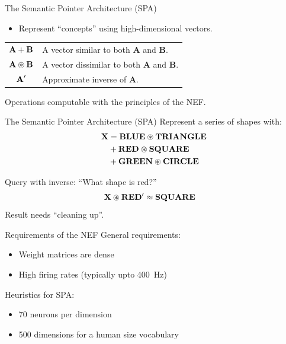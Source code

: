 \documentclass[handout,t]{beamer}
\newcommand{\semanticpointer}{\textbf}
\newcommand{\msemanticpointer}[1]{\mbox{\semanticpointer{#1}}}
\begin{document}
  \begin{frame}{The Semantic Pointer Architecture (SPA)}
    \begin{itemize}
      \item Represent ``concepts'' using high-dimensional vectors.
    \end{itemize}

    \begin{center}
      \begin{tabular}{c l}
        \toprule
          $\msemanticpointer{A} + \msemanticpointer{B}$ & A vector similar to both \semanticpointer{A} and \semanticpointer{B}. \\
          $\msemanticpointer{A} \circledast \msemanticpointer{B}$ & A vector dissimilar to both \semanticpointer{A} and \semanticpointer{B}. \\
          $\msemanticpointer{A}^\prime$ & Approximate inverse of \semanticpointer{A}. \\
        \bottomrule
      \end{tabular}
    \end{center}

    Operations computable with the principles of the NEF.
  \end{frame}

  \begin{frame}{The Semantic Pointer Architecture (SPA)}
    Represent a series of shapes with:
    \begin{align*}
      \msemanticpointer{X} &= \msemanticpointer{BLUE}\circledast\msemanticpointer{TRIANGLE} \\
                           &+ \msemanticpointer{RED}\circledast\msemanticpointer{SQUARE}\\
                           &+ \msemanticpointer{GREEN}\circledast\msemanticpointer{CIRCLE}
    \end{align*}

    Query with inverse: ``What shape is red?''
    \begin{align*}
      \msemanticpointer{X} \circledast \msemanticpointer{RED}^\prime &\approx \msemanticpointer{SQUARE}
    \end{align*}
    Result needs ``cleaning up''.
  \end{frame}

  \begin{frame}{Requirements of the NEF}
    General requirements:
    \begin{itemize}
      \item Weight matrices are dense
      \item High firing rates (typically upto \SI{400}{\hertz})
    \end{itemize}

    Heuristics for SPA:
    \begin{itemize}
      \item 70 neurons per dimension
      \item 500 dimensions for a human size vocabulary
    \end{itemize}
  \end{frame}
\end{document}
